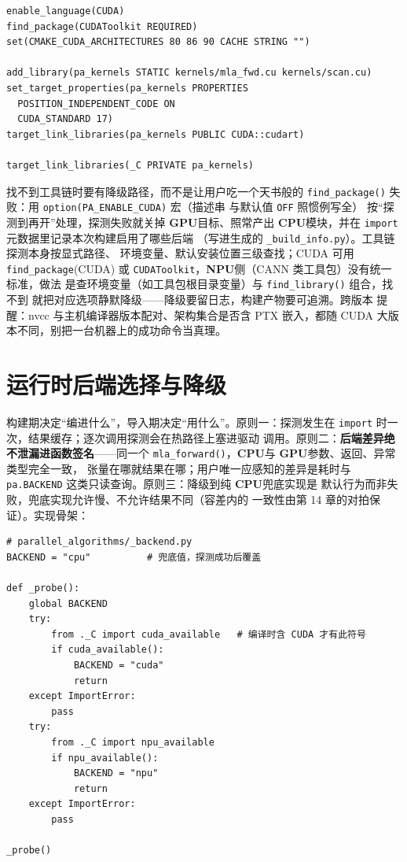 \documentclass[12pt,a4paper,fontset=fandol]{ctexbook}
\newcommand{\Fn}[1]{\texttt{#1()}}
\newcommand{\Tp}[1]{\texttt{#1}}
\newcommand{\Dom}[1]{\textsf{\bfseries #1}}
\newcommand{\CPU}{\Dom{CPU}}
\newcommand{\GPU}{\Dom{GPU}}
\newcommand{\NPU}{\Dom{NPU}}
\begin{document}
\begin{lstlisting}[style=cmakestyle,caption={CUDA 混合构建：核函数静态库进绑定模块},label={lst:cmake-cuda}]
enable_language(CUDA)
find_package(CUDAToolkit REQUIRED)
set(CMAKE_CUDA_ARCHITECTURES 80 86 90 CACHE STRING "")

add_library(pa_kernels STATIC kernels/mla_fwd.cu kernels/scan.cu)
set_target_properties(pa_kernels PROPERTIES
  POSITION_INDEPENDENT_CODE ON
  CUDA_STANDARD 17)
target_link_libraries(pa_kernels PUBLIC CUDA::cudart)

target_link_libraries(_C PRIVATE pa_kernels)
\end{lstlisting}

找不到工具链时要有降级路径，而不是让用户吃一个天书般的
\Fn{find\_package} 失败：用 \Tp{option(PA\_ENABLE\_CUDA)} 宏（描述串
与默认值 \Tp{OFF} 照惯例写全）
按``探测到再开''处理，探测失败就关掉 \GPU{}目标、照常产出
\CPU{}模块，并在 \Tp{import} 元数据里记录本次构建启用了哪些后端
（写进生成的 \Tp{\_build\_info.py}）。工具链探测本身按显式路径、
环境变量、默认安装位置三级查找；CUDA 可用 \Tp{find\_package}(CUDA)
或 \Tp{CUDAToolkit}，\NPU{}侧（CANN 类工具包）没有统一标准，做法
是查环境变量（如工具包根目录变量）与 \Fn{find\_library} 组合，找不到
就把对应选项静默降级——降级要留日志，构建产物要可追溯。跨版本
提醒：nvcc 与主机编译器版本配对、架构集合是否含 PTX 嵌入，都随
CUDA 大版本不同，别把一台机器上的成功命令当真理。

\section{运行时后端选择与降级}

构建期决定``编进什么''，导入期决定``用什么''。原则一：探测发生在
\Tp{import} 时一次，结果缓存；逐次调用探测会在热路径上塞进驱动
调用。原则二：\textbf{后端差异绝不泄漏进函数签名}——同一个
\Fn{mla\_forward}，\CPU{}与 \GPU{}参数、返回、异常类型完全一致，
张量在哪就结果在哪；用户唯一应感知的差异是耗时与
\Tp{pa.BACKEND} 这类只读查询。原则三：降级到纯 \CPU{}兜底实现是
默认行为而非失败，兜底实现允许慢、不允许结果不同（容差内的
一致性由第 14 章的对拍保证）。实现骨架：

\begin{lstlisting}[style=pythonstyle,caption={导入时探测，签名对后端一无所知}]
# parallel_algorithms/_backend.py
BACKEND = "cpu"          # 兜底值，探测成功后覆盖

def _probe():
    global BACKEND
    try:
        from ._C import cuda_available   # 编译时含 CUDA 才有此符号
        if cuda_available():
            BACKEND = "cuda"
            return
    except ImportError:
        pass
    try:
        from ._C import npu_available
        if npu_available():
            BACKEND = "npu"
            return
    except ImportError:
        pass

_probe()
\end{lstlisting}
\end{document}
